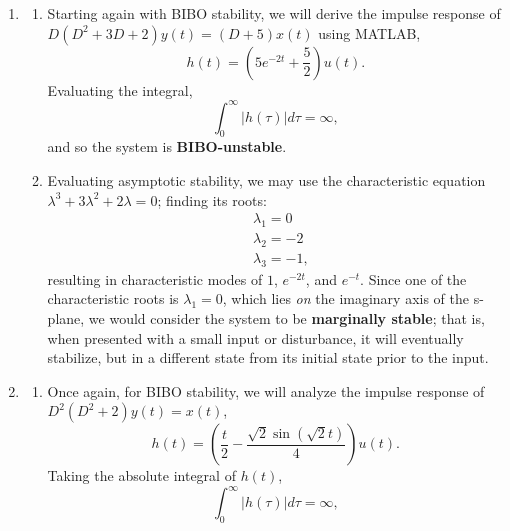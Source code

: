 \documentclass{article}
\begin{document}
\begin{enumerate}[label=\thesubsubsection]
\begin{enumerate}[label=\alph*)]
\begin{enumerate}[label=(\roman*)]
									Solving the system's characteristic equation \(\lambda^2 + 8\lambda + 12 = 0\), we will find characteristic modes 
								\begin{align*}
									&\lambda_1 = -6 \\
									&\lambda_2 = -2
								\end{align*}	
								Since both resultant characteristic modes, \(e^{-6t}\) and \(e^{-2t}\), have a negative real part, and are thus in the left side of the s-plane, the system is considered \textbf{asymptotically stable}.
							\end{enumerate}
						\item 
							\begin{enumerate}[label=(\roman*)]
                \item Starting again with BIBO stability, we will derive the impulse response of \(D(D^2+3D+2)y(t) = (D+5)x(t)\) using MATLAB, 
									\[
										h(t) = (5e^{-2t} + \frac{5}{2})u(t).
									\]
									Evaluating the integral, 
									\[
									  \int_{0}^{\infty}|h(\tau)|d\tau = \infty,
									\]
									and so the system is \textbf{BIBO-unstable}. 
								\item Evaluating asymptotic stability, we may use the characteristic equation \(\lambda^3 + 3\lambda^2 + 2\lambda = 0\); finding its roots: 
									\begin{align*}
									  & \lambda_1 = 0\\
										& \lambda_2 = -2\\
										& \lambda_3 = -1,
									\end{align*}
									resulting in characteristic modes of \(1\), \(e^{-2t}\), and \(e^{-t}\). Since one of the characteristic roots is \(\lambda_1 = 0\), which lies \textit{on} the imaginary axis of the s-plane, we would consider the system to be \textbf{marginally stable}; that is, when presented with a small input or disturbance, it will eventually stabilize, but in a different state from its initial state prior to the input.
							\end{enumerate}
						\item 
							\begin{enumerate}[label=(\roman*)]
								\item Once again, for BIBO stability, we will analyze the impulse response of \(D^2(D^2+2)y(t) = x(t)\), 									
									\[
										h(t) = (\frac{t}{2} - \frac{\sqrt{2}\sin{(\sqrt{2}t)}}{4})u(t).
									\]
									Taking the absolute integral of \(h(t)\), 
									\[
									  \int_{0}^{\infty}|h(\tau)|d\tau = \infty,
\]
\end{enumerate}
\end{enumerate}
\end{enumerate}
\end{document}
